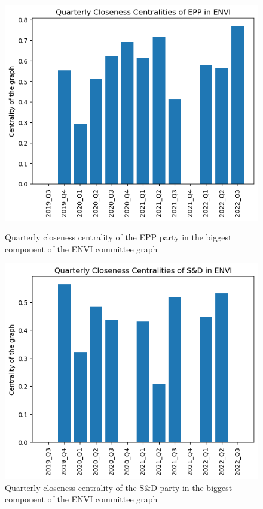 \documentclass[lettersize,journal]{IEEEtran}
\begin{document}
\begin{figure}[h]
  \centering
  \begin{minipage}[b]{0.23\textwidth}
    \includegraphics[width=\textwidth]{EPP_ENVI_Q_closeness_BIG.png}
    \caption{Quarterly closeness centrality of the EPP party in the  biggest component of the ENVI committee graph}
    \label{EPP_ENVI_Q_closeness_BIG}
  \end{minipage}
  \hfill
  \begin{minipage}[b]{0.23\textwidth}
    \includegraphics[width=\textwidth]{S&D_ENVI_Q_closeness_BIG.png}
    \caption{Quarterly closeness centrality of the S\&D party in the biggest component of the ENVI committee graph}
    \label{S&D_ENVI_Q_closeness_BIG}
  \end{minipage}
\end{figure}
\end{document}
